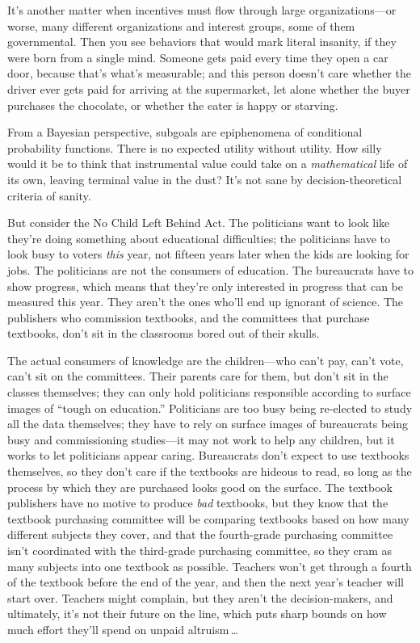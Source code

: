 {{{
 It's another matter when incentives must flow
through large organizations---or worse, many different organizations
and interest groups, some of them governmental. Then you see behaviors
that would mark literal insanity, if they were born from a single mind.
Someone gets paid every time they open a car door, because
that's what's measurable; and this
person doesn't care whether the driver ever gets paid
for arriving at the supermarket, let alone whether the buyer purchases
the chocolate, or whether the eater is happy or starving.}

{
 From a Bayesian perspective, subgoals are epiphenomena of
conditional probability functions. There is no expected utility without
utility. How silly would it be to think that instrumental value could
take on a \textit{mathematical} life of its own, leaving terminal value
in the dust? It's not sane by decision-theoretical
criteria of sanity.}

{
 But consider the No Child Left Behind Act. The politicians want to
look like they're doing something about educational
difficulties; the politicians have to look busy to voters \textit{this}
year, not fifteen years later when the kids are looking for jobs. The
politicians are not the consumers of education. The bureaucrats have to
show progress, which means that they're only interested
in progress that can be measured this year. They aren't
the ones who'll end up ignorant of science. The
publishers who commission textbooks, and the committees that purchase
textbooks, don't sit in the classrooms bored out of
their skulls.}

{
 The actual consumers of knowledge are the children---who
can't pay, can't vote,
can't sit on the committees. Their parents care for
them, but don't sit in the classes themselves; they can
only hold politicians responsible according to surface images of
``tough on education.'' Politicians
are too busy being re-elected to study all the data themselves; they
have to rely on surface images of bureaucrats being busy and
commissioning studies---it may not work to help any children, but it
works to let politicians appear caring. Bureaucrats
don't expect to use textbooks themselves, so they
don't care if the textbooks are hideous to read, so
long as the process by which they are purchased looks good on the
surface. The textbook publishers have no motive to produce \textit{bad}
textbooks, but they know that the textbook purchasing committee will be
comparing textbooks based on how many different subjects they cover,
and that the fourth-grade purchasing committee isn't
coordinated with the third-grade purchasing committee, so they cram as
many subjects into one textbook as possible. Teachers
won't get through a fourth of the textbook before the
end of the year, and then the next year's teacher will
start over. Teachers might complain, but they aren't
the decision-makers, and ultimately, it's not their
future on the line, which puts sharp bounds on how much effort
they'll spend on unpaid altruism\,\ldots}

}}
